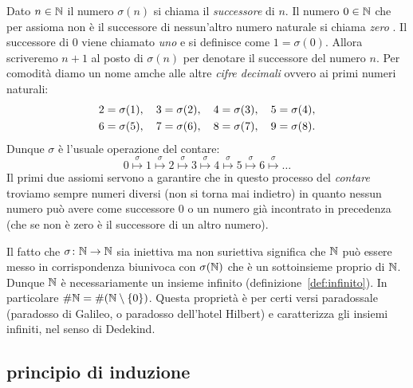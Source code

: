 Dato $n\in {\mathbb N}$ il numero $\sigma(n)$ si chiama il \emph{successore}%
%
 di $n$. 
Il numero $0\in {\mathbb N}$ che per assioma non è il successore di nessun'altro 
numero naturale si chiama \emph{zero}%
%
. 
Il successore di $0$ viene chiamato \emph{uno} e si definisce 
come $1=\sigma(0)$. 
Allora scriveremo $n+1$ al posto di $\sigma(n)$ per denotare 
il successore del numero $n$.
Per comodità diamo un nome amche alle altre \emph{cifre decimali}%
%
ovvero ai primi numeri naturali:
\begin{equation}\label{eq:cifre}
\begin{gathered}
 2 = \sigma(1),\quad
 3 = \sigma(2),\quad 
 4 = \sigma(3),\quad
 5 = \sigma(4),\\ 
 6 = \sigma(5),\quad 
 7 = \sigma(6),\quad 
 8 = \sigma(7),\quad 
 9 = \sigma(8).
\end{gathered}
\end{equation}
Dunque $\sigma$ è l'usuale operazione del contare:
 \[
 0 \stackrel\sigma\mapsto 1 \stackrel\sigma\mapsto 2 \stackrel\sigma\mapsto 
 3 \stackrel\sigma\mapsto 4 \stackrel\sigma\mapsto 5 \stackrel\sigma\mapsto 
 6 \stackrel\sigma\mapsto \dots  
 \]
Il primi due assiomi servono a garantire che in questo processo del \emph{contare}%
%
troviamo sempre numeri diversi (non si torna mai indietro) in quanto nessun numero 
può avere come successore $0$ o un numero già incontrato in precedenza (che 
se non è zero è il successore di un altro numero).

Il fatto che $\sigma\colon {\mathbb N}\to {\mathbb N}$ sia iniettiva ma non suriettiva 
significa che ${\mathbb N}$ può essere messo in corrispondenza biunivoca con 
$\sigma({\mathbb N})$ che è un sottoinsieme proprio di ${\mathbb N}$.
Dunque ${\mathbb N}$ è necessariamente un insieme infinito 
(definizione~\ref{def:infinito}).
In particolare $\#{\mathbb N} = \#{\left( {\mathbb N} \setminus{\left\{ 0 \right\}} \right)}$.
Questa proprietà è per certi versi paradossale
(paradosso di Galileo, o paradosso dell'hotel Hilbert)
%
%
%
%
e caratterizza gli 
insiemi infiniti, nel senso di Dedekind.%
%

\subsection{principio di induzione}


